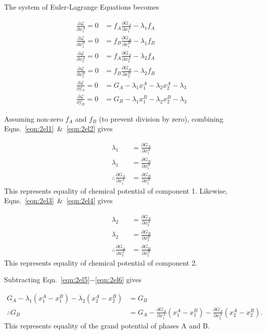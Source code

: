 \documentclass[10pt]{article}
\begin{document}
The system of Euler-Lagrange Equations becomes

\begin{align}
  \label{eqn:2el1}
  \frac{\partial\mathcal{L}}{\partial x_1^A} = 0 &= f_A \frac{\partial G_A}{\partial x_1^A} - \lambda_1 f_A\\
  \label{eqn:2el2}
  \frac{\partial\mathcal{L}}{\partial x_1^B} = 0 &= f_B \frac{\partial G_B}{\partial x_1^B} - \lambda_1 f_B\\
  \label{eqn:2el3}
  \frac{\partial\mathcal{L}}{\partial x_2^A} = 0 &= f_A \frac{\partial G_A}{\partial x_2^A} - \lambda_2 f_A\\
  \label{eqn:2el4}
  \frac{\partial\mathcal{L}}{\partial x_2^B} = 0 &= f_B \frac{\partial G_B}{\partial x_2^B} - \lambda_2 f_B\\
  \label{eqn:2el5}
  \frac{\partial\mathcal{L}}{\partial f_A} = 0 &= G_A - \lambda_1 x_1^A - \lambda_2 x_2^A - \lambda_3\\
  \label{eqn:2el6}
  \frac{\partial\mathcal{L}}{\partial f_B} = 0 &= G_B - \lambda_1 x_1^B - \lambda_2 x_2^B - \lambda_3
\end{align}

Assuming non-zero $f_A$ and $f_B$ (to prevent division by zero), combining Eqns.~\ref{eqn:2el1}~\&~\ref{eqn:2el2} gives

\begin{align}
  \lambda_1 &= \frac{\partial G_A}{\partial x_1^A}\\
  \lambda_1 &= \frac{\partial G_B}{\partial x_1^B}\\
  \label{eqn:chempot1}
  \therefore \frac{\partial G_A}{\partial x_1^A} &= \frac{\partial G_B}{\partial x_1^B}
\end{align}
This represents equality of chemical potential of component 1.
Likewise, Eqns.~\ref{eqn:2el3}~\&~\ref{eqn:2el4} gives

\begin{align}
  \lambda_2 &= \frac{\partial G_A}{\partial x_2^A}\\
  \lambda_2 &= \frac{\partial G_B}{\partial x_2^B}\\
  \label{eqn:chempot2}
  \therefore \frac{\partial G_A}{\partial x_2^A} &= \frac{\partial G_B}{\partial x_2^B}
\end{align}
This represents equality of chemical potential of component 2.

Subtracting Eqn.~\ref{eqn:2el5}$-$\ref{eqn:2el6} gives

\begin{align}
  G_A - \lambda_1(x_1^A - x_1^B) - \lambda_2(x_2^A - x_2^B) &= G_B\\
  \label{eqn:grandpot1}
  \therefore G_B &= G_A - \frac{\partial G_A}{\partial x_1^A}(x_1^A - x_1^B) - \frac{\partial G_A}{\partial x_2^A}(x_2^A - x_2^B).
\end{align}
This represents equality of the grand potential of phases A and B.
\end{document}
